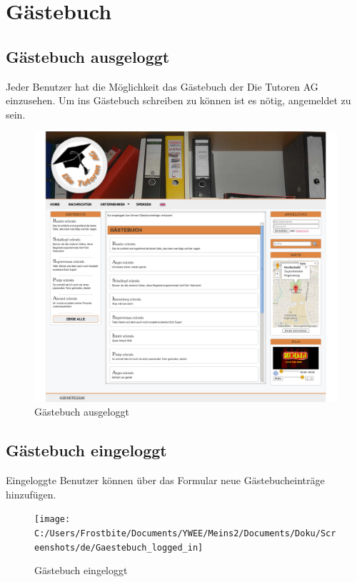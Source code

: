 
\section{Gästebuch}

\subsection{Gästebuch ausgeloggt}

Jeder Benutzer hat die Möglichkeit das Gästebuch der Die Tutoren AG einzusehen. \newline Um ins Gästebuch schreiben zu können ist es nötig, angemeldet zu sein.
\begin{figure}[!htbp]
\centering
\includegraphics[width=1\linewidth]{../Screenshots/de/Gaestebuch}
\caption{Gästebuch ausgeloggt}
\label{fig:Gaestebuch}
\end{figure}

\newpage
\subsection{Gästebuch eingeloggt}

Eingeloggte Benutzer können über das Formular neue Gästebucheinträge hinzufügen.

\begin{figure}[!htbp]
\centering
\texttt{[image: C:/Users/Frostbite/Documents/YWEE/Meins2/Documents/Doku/Screenshots/de/Gaestebuch\_logged\_in]}
\caption{Gästebuch eingeloggt}
\label{fig:Gaestebuch_logged_in}
\end{figure}


